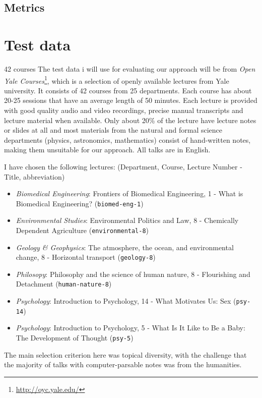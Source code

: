\documentclass[]{article}
\begin{document}
\subsection{Metrics}\label{metrics}

\section{Test data}\label{test-data}

42 courses The test data i will use for evaluating our approach will be
from \emph{Open Yale Courses}\footnote{\url{http://oyc.yale.edu/}},
which is a selection of openly available lectures from Yale university.
It consists of 42 courses from 25 departments. Each course has about
20-25 sessions that have an average length of 50 minutes. Each lecture
is provided with good quality audio and video recordings, precise manual
transcripts and lecture material when available. Only about 20\% of the
lecture have lecture notes or slides at all and most materials from the
natural and formal science departments (physics, astronomics,
mathematics) consist of hand-written notes, making them unsuitable for
our approach. All talks are in English.

I have chosen the following lectures: (Department, Course, Lecture
Number - Title, abbreviation)

\begin{itemize}
\item
  \emph{Biomedical Engineering}: Frontiers of Biomedical Engineering, 1
  - What is Biomedical Engineering? (\texttt{biomed-eng-1})
\item
  \emph{Environmental Studies}: Environmental Politics and Law, 8 -
  Chemically Dependent Agriculture (\texttt{environmental-8})
\item
  \emph{Geology \& Geophysics}: The atmosphere, the ocean, and
  environmental change, 8 - Horizontal transport (\texttt{geology-8})
\item
  \emph{Philosopy}: Philosophy and the science of human nature, 8 -
  Flourishing and Detachment (\texttt{human-nature-8})
\item
  \emph{Psychology}: Introduction to Psychology, 14 - What Motivates Us:
  Sex (\texttt{psy-14})
\item
  \emph{Psychology}: Introduction to Psychology, 5 - What Is It Like to
  Be a Baby: The Development of Thought (\texttt{psy-5})
\end{itemize}

The main selection criterion here was topical diversity, with the
challenge that the majority of talks with computer-parsable notes was
from the humanities.
\end{document}
